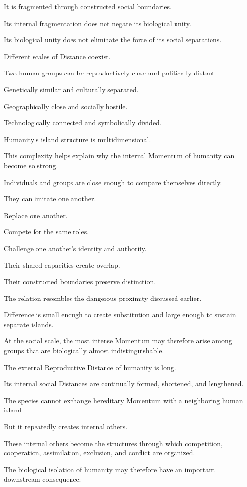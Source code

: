 It is fragmented through constructed social boundaries.

Its internal fragmentation does not negate its biological unity.

Its biological unity does not eliminate the force of its social separations.

Different scales of Distance coexist.

Two human groups can be reproductively close and politically distant.

Genetically similar and culturally separated.

Geographically close and socially hostile.

Technologically connected and symbolically divided.

Humanity’s island structure is multidimensional.

This complexity helps explain why the internal Momentum of humanity can become so strong.

Individuals and groups are close enough to compare themselves directly.

They can imitate one another.

Replace one another.

Compete for the same roles.

Challenge one another’s identity and authority.

Their shared capacities create overlap.

Their constructed boundaries preserve distinction.

The relation resembles the dangerous proximity discussed earlier.

Difference is small enough to create substitution and large enough to sustain separate islands.

At the social scale, the most intense Momentum may therefore arise among groups that are biologically almost indistinguishable.

The external Reproductive Distance of humanity is long.

Its internal social Distances are continually formed, shortened, and lengthened.

The species cannot exchange hereditary Momentum with a neighboring human island.

But it repeatedly creates internal others.

These internal others become the structures through which competition, cooperation, assimilation, exclusion, and conflict are organized.

The biological isolation of humanity may therefore have an important downstream consequence:

